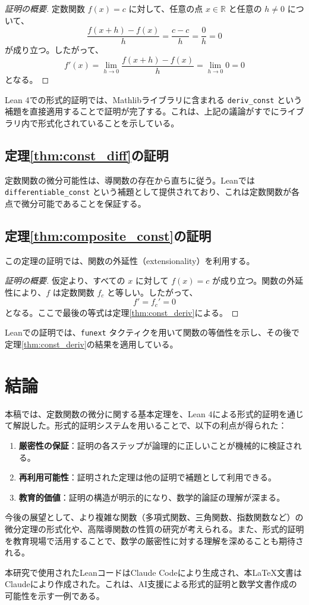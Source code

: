 \documentclass[uplatex, a4paper]{jlreq}
\begin{document}
\begin{proof}[証明の概要]
定数関数 $f(x) = c$ に対して、任意の点 $x \in \mathbb{R}$ と任意の $h \neq 0$ について、
\[
\frac{f(x+h) - f(x)}{h} = \frac{c - c}{h} = \frac{0}{h} = 0
\]
が成り立つ。したがって、
\[
f'(x) = \lim_{h \to 0} \frac{f(x+h) - f(x)}{h} = \lim_{h \to 0} 0 = 0
\]
となる。
\end{proof}

Lean 4での形式的証明では、Mathlibライブラリに含まれる \texttt{deriv\_const} という補題を直接適用することで証明が完了する。これは、上記の議論がすでにライブラリ内で形式化されていることを示している。

\subsection{定理\ref{thm:const_diff}の証明}

定数関数の微分可能性は、導関数の存在から直ちに従う。Leanでは \texttt{differentiable\_const} という補題として提供されており、これは定数関数が各点で微分可能であることを保証する。

\subsection{定理\ref{thm:composite_const}の証明}

この定理の証明では、関数の外延性（extensionality）を利用する。

\begin{proof}[証明の概要]
仮定より、すべての $x$ に対して $f(x) = c$ が成り立つ。関数の外延性により、$f$ は定数関数 $f_c$ と等しい。したがって、
\[
f' = f_c' = 0
\]
となる。ここで最後の等式は定理\ref{thm:const_deriv}による。
\end{proof}

Leanでの証明では、\texttt{funext} タクティクを用いて関数の等価性を示し、その後で定理\ref{thm:const_deriv}の結果を適用している。

\section{結論}

本稿では、定数関数の微分に関する基本定理を、Lean 4による形式的証明を通じて解説した。形式的証明システムを用いることで、以下の利点が得られた：

\begin{enumerate}
\item \textbf{厳密性の保証}：証明の各ステップが論理的に正しいことが機械的に検証される。
\item \textbf{再利用可能性}：証明された定理は他の証明で補題として利用できる。
\item \textbf{教育的価値}：証明の構造が明示的になり、数学的論証の理解が深まる。
\end{enumerate}

今後の展望として、より複雑な関数（多項式関数、三角関数、指数関数など）の微分定理の形式化や、高階導関数の性質の研究が考えられる。また、形式的証明を教育現場で活用することで、数学の厳密性に対する理解を深めることも期待される。

本研究で使用されたLeanコードはClaude Codeにより生成され、本LaTeX文書はClaudeにより作成された。これは、AI支援による形式的証明と数学文書作成の可能性を示す一例である。
\end{document}
